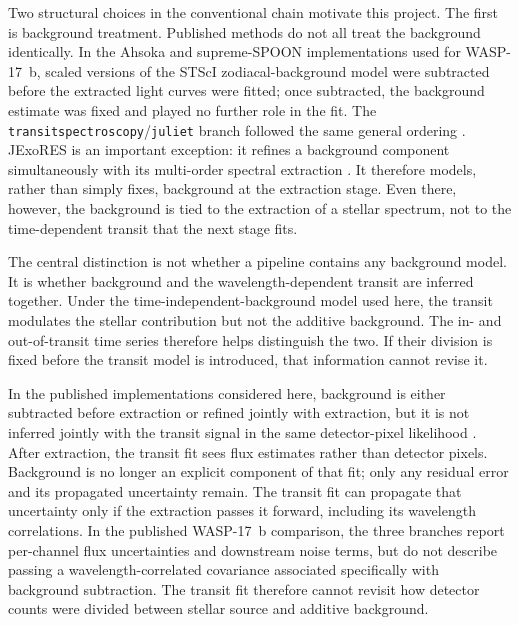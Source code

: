 Two structural choices in the conventional chain motivate this project. The
first is background treatment. Published methods do not all treat the
background identically. In the Ahsoka and supreme-SPOON implementations used
for WASP-17~b, scaled versions of the STScI zodiacal-background model were
subtracted before the extracted light curves were fitted; once subtracted,
the background estimate was fixed and played no further role in the fit.
The
\texttt{transitspectroscopy}/\texttt{juliet} branch followed the same general
ordering \citep{LouieEtAl2025}. JExoRES is an important exception: it refines a
background component simultaneously with its multi-order spectral extraction
\citep{HolmbergMadhusudhan2023}. It therefore models, rather than simply fixes,
background at the extraction stage. Even there, however, the background is
tied to the extraction of a stellar spectrum, not to the time-dependent
transit that the next stage fits.

The central distinction is not whether a pipeline contains any background
model. It is whether background and the wavelength-dependent transit are
inferred together. Under the time-independent-background model used here, the
transit modulates the stellar contribution but not the additive background.
The in- and out-of-transit time series therefore helps distinguish the two. If
their division is fixed before the transit model is introduced, that
information cannot revise it.

In the published implementations considered here,
background is either subtracted before extraction or refined jointly with
extraction, but it is not inferred jointly with the transit signal in the same
detector-pixel likelihood
\citep{HolmbergMadhusudhan2023,LouieEtAl2025}. After extraction, the transit
fit sees flux estimates rather than detector pixels. Background is no longer
an explicit component of that fit; only any residual error and its propagated
uncertainty remain. The transit fit can propagate that uncertainty only if the
extraction passes it forward, including its wavelength correlations. In the
published WASP-17~b comparison, the three branches report per-channel flux
uncertainties and downstream noise terms, but do not describe passing a
wavelength-correlated covariance associated specifically with background
subtraction. The transit fit therefore cannot revisit how detector counts were
divided between stellar source and additive background.

